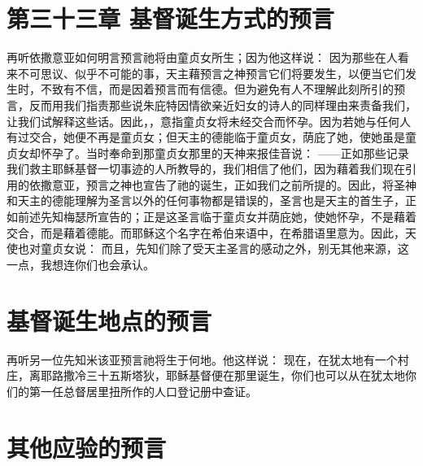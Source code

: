 \section{第三十三章 基督诞生方式的预言}

再听依撒意亚如何明言预言祂将由童贞女所生；因为他这样说：  因为那些在人看来不可思议、似乎不可能的事，天主藉预言之神预言它们将要发生，以便当它们发生时，不致有不信，而是因着预言而有信德。但为避免有人不理解此刻所引的预言，反而用我们指责那些说朱庇特因情欲亲近妇女的诗人的同样理由来责备我们，让我们试解释这些话。因此，，意指童贞女将未经交合而怀孕。因为若她与任何人有过交合，她便不再是童贞女；但天主的德能临于童贞女，荫庇了她，使她虽是童贞女却怀孕了。当时奉命到那童贞女那里的天神来报佳音说：  ——正如那些记录我们救主耶稣基督一切事迹的人所教导的，我们相信了他们，因为藉着我们现在引用的依撒意亚，预言之神也宣告了祂的诞生，正如我们之前所提的。因此，将圣神和天主的德能理解为圣言以外的任何事物都是错误的，圣言也是天主的首生子，正如前述先知梅瑟所宣告的；正是这圣言临于童贞女并荫庇她，使她怀孕，不是藉着交合，而是藉着德能。而耶稣这个名字在希伯来语中，在希腊语里意为。因此，天使也对童贞女说： 而且，先知们除了受天主圣言的感动之外，别无其他来源，这一点，我想连你们也会承认。\par


\section{基督诞生地点的预言}

再听另一位先知米该亚预言祂将生于何地。他这样说：  现在，在犹太地有一个村庄，离耶路撒冷三十五斯塔狄，耶稣基督便在那里诞生，你们也可以从在犹太地你们的第一任总督居里扭所作的人口登记册中查证。\par


\section{其他应验的预言}

